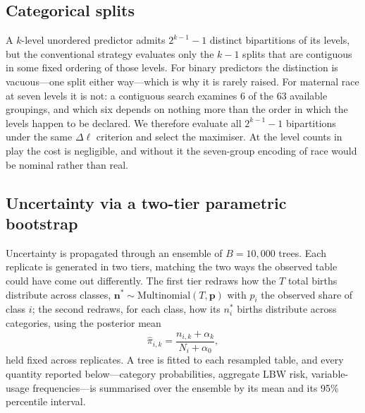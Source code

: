 \subsection{Categorical splits}

A $k$-level unordered predictor admits $2^{k-1}-1$ distinct bipartitions of its
levels, but the conventional strategy evaluates only the $k-1$ splits that are
contiguous in some fixed ordering of those levels. For binary predictors the
distinction is vacuous---one split either way---which is why it is rarely
raised. For maternal race at seven levels it is not: a contiguous search
examines $6$ of the $63$ available groupings, and which six depends on nothing
more than the order in which the levels happen to be declared. We therefore
evaluate all $2^{k-1}-1$ bipartitions under the same $\Delta\ell$ criterion and
select the maximiser. At the level counts in play the cost is negligible, and
without it the seven-group encoding of race would be nominal rather than real.

\subsection{Uncertainty via a two-tier parametric bootstrap}

Uncertainty is propagated through an ensemble of $B=10{,}000$ trees. Each
replicate is generated in two tiers, matching the two ways the observed table
could have come out differently. The first tier redraws how the $T$ total
births distribute across classes,
$\mathbf{n}^{\ast}\sim\text{Multinomial}(T,\mathbf{p})$ with $p_i$ the observed
share of class $i$; the second redraws, for each class, how its $n_i^{\ast}$
births distribute across categories, using the posterior mean
\[
  \hat{\pi}_{i,k}
  =\frac{n_{i,k}+\alpha_k}{N_i+\alpha_0},
\]
held fixed across replicates. A tree is fitted to each resampled table, and
every quantity reported below---category probabilities, aggregate LBW risk,
variable-usage frequencies---is summarised over the ensemble by its mean and
its 95\% percentile interval.

